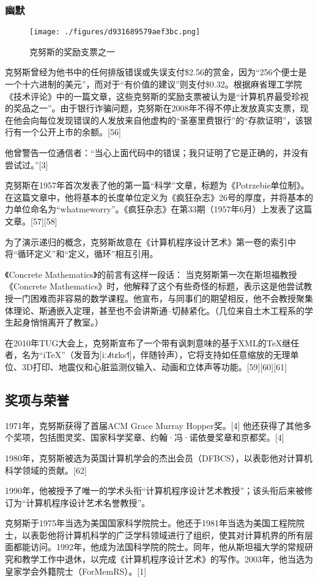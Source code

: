 \subsubsection{幽默}
\begin{figure}[ht]
\centering
\texttt{[image: ./figures/d931689579aef3bc.png]}
\caption{克努斯的奖励支票之一} \label{fig_GDN_2}
\end{figure}
克努斯曾经为他书中的任何排版错误或失误支付\$2.56的赏金，因为“256个便士是一个十六进制的美元”，而对于“有价值的建议”则支付\$0.32。根据麻省理工学院《技术评论》中的一篇文章，这些克努斯的奖励支票被认为是“计算机界最受珍视的奖品之一”。由于银行诈骗问题，克努斯在2008年不得不停止发放真实支票，现在他会向每位发现错误的人发放来自他虚构的“圣塞里费银行”的“存款证明”，该银行有一个公开上市的余额。[56]

他曾警告一位通信者：“当心上面代码中的错误；我只证明了它是正确的，并没有尝试过。”[3]

克努斯在1957年首次发表了他的第一篇“科学”文章，标题为《Potrzebie单位制》。在这篇文章中，他将基本的长度单位定义为《疯狂杂志》26号的厚度，并将基本的力单位命名为“whatmeworry”。《疯狂杂志》在第33期（1957年6月）上发表了这篇文章。[57][58]

为了演示递归的概念，克努斯故意在《计算机程序设计艺术》第一卷的索引中将“循环定义”和“定义，循环”相互引用。

《Concrete Mathematics》的前言有这样一段话：
当克努斯第一次在斯坦福教授《Concrete Mathematics》时，他解释了这个有些奇怪的标题，表示这是他尝试教授一门困难而非容易的数学课程。他宣布，与同事们的期望相反，他不会教授聚集体理论、斯通嵌入定理，甚至也不会讲斯通–切赫紧化。（几位来自土木工程系的学生起身悄悄离开了教室。）

在2010年TUG大会上，克努斯宣布了一个带有讽刺意味的基于XML的TeX继任者，名为“iTeX”（发音为[iː˨˩˦tɛks˧˥]，伴随铃声），它将支持如任意缩放的无理单位、3D打印、地震仪和心脏监测仪输入、动画和立体声等功能。[59][60][61]
\subsection{奖项与荣誉}  
1971年，克努斯获得了首届ACM Grace Murray Hopper奖。[4] 他还获得了其他多个奖项，包括图灵奖、国家科学奖章、约翰·冯·诺依曼奖章和京都奖。[4]

1980年，克努斯被选为英国计算机学会的杰出会员（DFBCS），以表彰他对计算机科学领域的贡献。[62]

1990年，他被授予了唯一的学术头衔“计算机程序设计艺术教授”；该头衔后来被修订为“计算机程序设计艺术名誉教授”。

克努斯于1975年当选为美国国家科学院院士。他还于1981年当选为美国工程院院士，以表彰他将计算机科学的广泛学科领域进行了组织，使其对计算机界的所有层面都能访问。1992年，他成为法国科学院的院士。同年，他从斯坦福大学的常规研究和教学工作中退休，以完成《计算机程序设计艺术》的写作。2003年，他当选为皇家学会外籍院士（ForMemRS）。[1]

